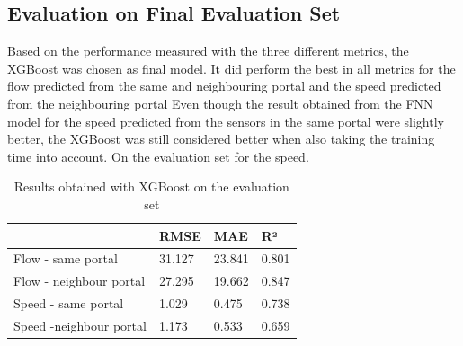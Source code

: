 	\subsection{Evaluation on Final Evaluation Set}
	Based on the performance measured with the three different metrics, the XGBoost was chosen as final model. It did perform the best in all metrics for the flow predicted from the same and neighbouring portal and the speed predicted from the neighbouring portal Even though the result obtained from the FNN model for the speed predicted from the sensors in the same portal were slightly better, the XGBoost was still considered better when also taking the training time into account. \newline 
	On the evaluation set 
	for the speed.
	\begin{table}[H]
		\centering
		\caption{Results obtained with XGBoost on the evaluation set}
		\label{tab:result_xgb_evaluation}
		\begin{tabular}{l|lll}
			& RMSE   & MAE    & R²    \\
			\hline
			Flow - same portal      &31.127 & 23.841 & 0.801\\
			Flow - neighbour portal &  27.295 &19.662 &0.847\\
			Speed - same portal     &1.029 & 0.475& 0.738\\
			Speed -neighbour portal & 1.173 & 0.533 & 0.659
		\end{tabular}
	\end{table}
